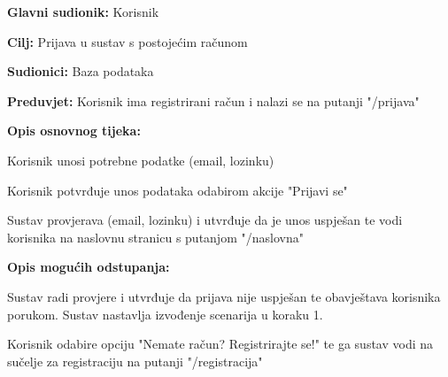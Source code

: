 					
						\noindent {}
					\begin{packed_item}
						
						\item \textbf{Glavni sudionik: }Korisnik
						\item  \textbf{Cilj:} Prijava u sustav s postojećim računom
						\item  \textbf{Sudionici:} Baza podataka
						\item  \textbf{Preduvjet:} Korisnik ima registrirani račun i nalazi se na putanji "/prijava"
						\item  \textbf{Opis osnovnog tijeka:}
						
						\item[] \begin{packed_enum}
							\item Korisnik unosi potrebne podatke (email, lozinku)
							\item Korisnik potvrđuje unos podataka odabirom akcije "Prijavi se"
							\item Sustav provjerava (email, lozinku) i utvrđuje da je unos uspješan te vodi korisnika na naslovnu stranicu s putanjom "/naslovna"
						\end{packed_enum}
						
						\item  \textbf{Opis mogućih odstupanja:}
						
						\item[] \begin{packed_item}
							
							\item[3.a] Sustav radi provjere i utvrđuje da prijava nije uspješan te obavještava korisnika porukom. Sustav nastavlja izvođenje scenarija u koraku 1. 
							
							\item[3.b] Korisnik odabire opciju "Nemate račun? Registrirajte se!" te ga sustav vodi na sučelje za registraciju na putanji "/registracija"							
						\end{packed_item}
						
					\end{packed_item}
					
